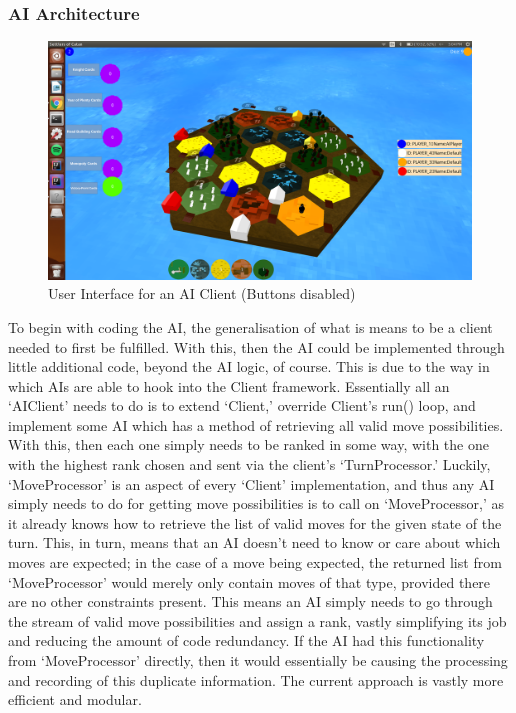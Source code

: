 \documentclass[a4paper,doc,draftfirst]{apa6}
\begin{document}
\subsubsection{AI Architecture}
\begin{figure}[hbtp]
      \includegraphics[width=\textwidth]{userInterfaceAI}
      \caption{User Interface for an AI Client (Buttons disabled)}
\end{figure}
To begin with coding the AI, the generalisation of what is means to be a client needed to first be fulfilled. With this, then the AI could be implemented through little additional code, beyond the AI logic, of course. This is due to the way in which AIs are able to hook into the Client framework. Essentially all an ‘AIClient’ needs to do is to extend ‘Client,’ override Client’s run() loop, and implement some AI which has a method of retrieving all valid move possibilities.  With this, then each one simply needs to be ranked in some way, with the one with the highest rank chosen and sent via the client’s ‘TurnProcessor.’ Luckily, ‘MoveProcessor’ is an aspect of every ‘Client’ implementation, and thus any AI simply needs to do for getting move possibilities is to call on ‘MoveProcessor,’ as it already knows how to retrieve the list of valid moves for the given state of the turn. This, in turn, means that an AI doesn’t need to know or care about which moves are expected; in the case of a move being expected, the returned list from ‘MoveProcessor’ would merely only contain moves of that type, provided there are no other constraints present. This means an AI simply needs to go through the stream of valid move possibilities and assign a rank, vastly simplifying its job and reducing the amount of code redundancy. If the AI had this functionality from ‘MoveProcessor’ directly, then it would essentially be causing the processing and recording of this duplicate information. The current approach is vastly more efficient and modular.
\end{document}
